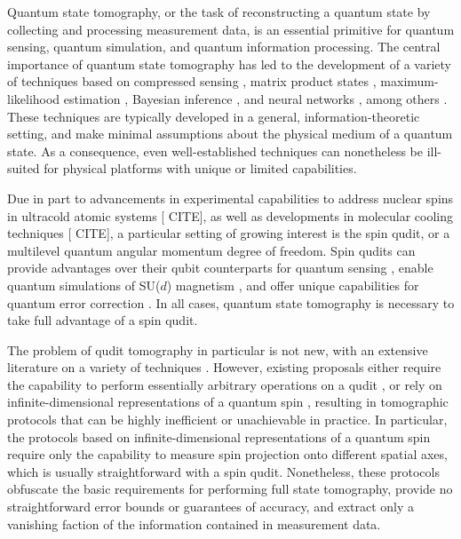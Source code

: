 \documentclass[notitlepage,twocolumn]{revtex4-2}
\newcommand{\1}{\mathds{1}}
\newcommand{\red}[1]{{\color{red} #1}}
\begin{document}
Quantum state tomography, or the task of reconstructing a quantum state by collecting and processing measurement data, is an essential primitive for quantum sensing, quantum simulation, and quantum information processing.
The central importance of quantum state tomography has led to the development of a variety of techniques based on compressed sensing \cite{gross2010quantum}, matrix product states \cite{cramer2010efficient}, maximum-likelihood estimation \cite{smolin2012efficient}, Bayesian inference \cite{huszar2012adaptive}, and neural networks \cite{torlai2018neuralnetwork}, among others \cite{christandl2012reliable, qi2013quantum, opatrny1997leastsquares}.
These techniques are typically developed in a general, information-theoretic setting, and make minimal assumptions about the physical medium of a quantum state.
As a consequence, even well-established techniques can nonetheless be ill-suited for physical platforms with unique or limited capabilities.

Due in part to advancements in experimental capabilities to address nuclear spins in ultracold atomic systems [\red{CITE}], as well as developments in molecular cooling techniques [\red{CITE}], a particular setting of growing interest is the spin qudit, or a multilevel quantum angular momentum degree of freedom.
Spin qudits can provide advantages over their qubit counterparts for quantum sensing \cite{evrard2019enhanced}, enable quantum simulations of SU($d$) magnetism \cite{banerjee2013atomic, cazalilla2014ultracold, zhang2014spectroscopic, scazza2014observation, goban2018emergence}, and offer unique capabilities for quantum error correction \cite{albert2020robust, gross2020encoding}.
In all cases, quantum state tomography is necessary to take full advantage of a spin qudit.

The problem of qudit tomography in particular is not new, with an extensive literature on a variety of techniques \cite{manko1997spin, thew2002qudit, flammia2005minimal, salazar2012quantum, sosa-martinez2017quantum, ha2018minimal, evrard2019enhanced, stefano2019set, palici2020oam}.
However, existing proposals either require the capability to perform essentially arbitrary operations on a qudit \cite{thew2002qudit, flammia2005minimal, salazar2012quantum, sosa-martinez2017quantum, ha2018minimal, stefano2019set, palici2020oam}, or rely on infinite-dimensional representations of a quantum spin \cite{manko1997spin, evrard2019enhanced}, resulting in tomographic protocols that can be highly inefficient or unachievable in practice.
In particular, the protocols based on infinite-dimensional representations of a quantum spin require only the capability to measure spin projection onto different spatial axes, which is usually straightforward with a spin qudit.
Nonetheless, these protocols obfuscate the basic requirements for performing full state tomography, provide no straightforward error bounds or guarantees of accuracy, and extract only a vanishing faction of the information contained in measurement data.
\end{document}
